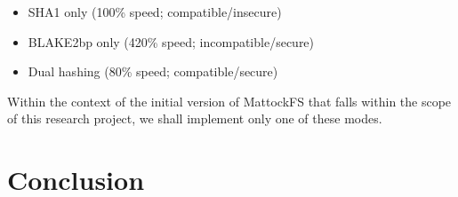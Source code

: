 \begin{itemize}
\item SHA1 only (100\% speed; compatible/insecure)
\item BLAKE2bp only (420\% speed; incompatible/secure)
\item Dual hashing (80\% speed; compatible/secure)
\end{itemize}
Within the context of the initial version of MattockFS that falls within the scope of this research project, we shall implement only one of these modes.
\section{Conclusion}

